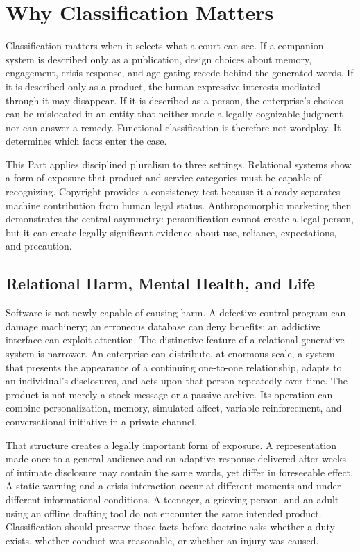 \section{Why Classification Matters}
\label{sec:classification}

Classification matters when it selects what a court can see. If a companion system is described only as a publication, design choices about memory, engagement, crisis response, and age gating recede behind the generated words. If it is described only as a product, the human expressive interests mediated through it may disappear. If it is described as a person, the enterprise's choices can be mislocated in an entity that neither made a legally cognizable judgment nor can answer a remedy. Functional classification is therefore not wordplay. It determines which facts enter the case.

This Part applies disciplined pluralism to three settings. Relational systems show a form of exposure that product and service categories must be capable of recognizing. Copyright provides a consistency test because it already separates machine contribution from human legal status. Anthropomorphic marketing then demonstrates the central asymmetry: personification cannot create a legal person, but it can create legally significant evidence about use, reliance, expectations, and precaution.

\subsection{Relational Harm, Mental Health, and Life}

Software is not newly capable of causing harm. A defective control program can damage machinery; an erroneous database can deny benefits; an addictive interface can exploit attention. The distinctive feature of a relational generative system is narrower. An enterprise can distribute, at enormous scale, a system that presents the appearance of a continuing one-to-one relationship, adapts to an individual's disclosures, and acts upon that person repeatedly over time. The product is not merely a stock message or a passive archive. Its operation can combine personalization, memory, simulated affect, variable reinforcement, and conversational initiative in a private channel.

That structure creates a legally important form of exposure. A representation made once to a general audience and an adaptive response delivered after weeks of intimate disclosure may contain the same words, yet differ in foreseeable effect. A static warning and a crisis interaction occur at different moments and under different informational conditions. A teenager, a grieving person, and an adult using an offline drafting tool do not encounter the same intended product. Classification should preserve those facts before doctrine asks whether a duty exists, whether conduct was reasonable, or whether an injury was caused.

